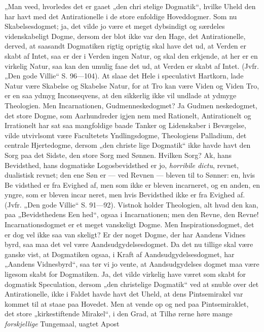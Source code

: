 \documentclass[12pt]{book}
\newcommand{\opage}[1]{\marginnote{\footnotesize\textit{[#1]}}}
\begin{document}
„Man veed, hvorledes det er gaaet „den chri\-%
stelige Dogmatik“, hvilke Uheld den har havt med
det Antirationelle i de store enfoldige Hoveddogmer.
Som nu Skabelsesdogmet; ja, det vilde jo være et meget
dybsindigt og særdeles videnskabeligt Dogme, dersom
der blot ikke var den Hage, det Antirationelle, derved,
at saasandt Dogmatiken rigtig oprigtig skal have det
ud, at Verden er skabt af Intet, saa er der i Verden
ingen Natur, og skal den erkjende, at her er en virkelig
Natur, saa kan den umulig faae det ud, at Verden er
skabt af Intet. (Jvfr. „Den gode Villie“ S. 96---104).
At slaae det Hele i speculativt Hartkorn, lade Natur
være Skabelse og Skabelse Natur, for at Tro kan være
Viden og Viden Tro, er en saa ydmyg Inconseqvens,
at den sikkerlig ikke vil undlade at ydmyge Theologien.
Men Incarnationen, Gudmenneskedogmet? Ja Gudmen\-%
neskedogmet, det store Dogme, som Aarhundreder igjen\-%
nem med Rationelt, Antirationelt og Irrationelt har sat saa
mangfoldige baade Tanker og Lidenskaber i Bevægelse, vilde
utvivlsomt være Facultetets Yndlingsdogme, Theologiens
Palladium, det centrale Hjertedogme, dersom „den christe\-%
\opage{240}\setcounter{footnote}{0}%
lige Dogmatik“ ikke havde havt den Sorg paa det Sidste,
den store Sorg med Sønnen. Hvilken Sorg? Ak, hans
Bevidsthed, hans dogmatiske Logosbevidsthed er jo,
\textit{horribile dictu}, revnet, dualistisk revnet; den ene Søn
er --- ved Revnen --- bleven til to Sønner: en, hvis Be\-%
vidsthed er fra Evighed af, men som ikke er bleven
incarneret, og en anden, en yngre, som er bleven incar\-%
neret, men hvis Bevidsthed ikke er fra Evighed af.
(Jvfr. „Den gode Villie“ S. 91---92). Vistnok holder
Theologien, alt hvad den kan, paa „Bevidsthedens Een\-%
hed“, ogsaa i Incarnationen; men den Revne, den
Revne! Incarnationsdogmet er et meget vanskeligt Dogme.
Men Inspirationsdogmet, det er dog vel ikke saa van\-%
skeligt? Er der noget Dogme, der har Aandens Vidnes\-%
byrd, saa maa det vel være Aandsudgydelsesdogmet.
Da det nu tillige skal være ganske vist, at Dogmatiken
ogsaa, i Kraft af Aandsudgydelsesdogmet, har „Aandens
Vidnesbyrd“, saa tør vi jo vente, at Aandsudgydelses\-%
dogmet maa være ligesom skabt for Dogmatiken. Ja,
det vilde virkelig have været som skabt for dogmatisk
Speculation, dersom „den christelige Dogmatik“ ved at
snuble over det Antirationelle, ikke i Faldet havde havt det
Uheld, at dens Pintsemirakel var kommet til at staae paa
Hovedet. Men at vende op og ned paa Pintsemiraklet,
det store „kirkestiftende Mirakel“, i den Grad, at Tilhø\-%
rerne høre mange \emph{forskjellige} Tungemaal, uagtet Apost\-%
\end{document}
